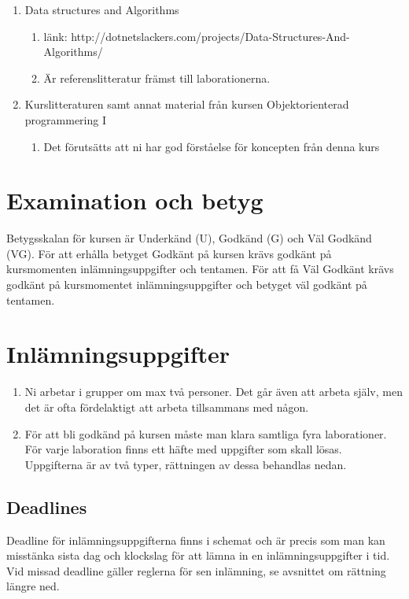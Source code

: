 \documentclass{article}
\begin{document}
  \begin{enumerate}
  \item Data structures and Algorithms
   		\begin{enumerate}
   		  \item länk: http://dotnetslackers.com/projects/Data-Structures-And-Algorithms/
   		  \item Är referenslitteratur främst till laborationerna.
   		\end{enumerate}
  \item Kurslitteraturen samt annat material från kursen Objektorienterad programmering I
     		\begin{enumerate}
     		  \item Det förutsätts att ni har god förståelse för koncepten från denna kurs	 
     		\end{enumerate}
  \end{enumerate}
  \section*{Examination och betyg}
  Betygsskalan för kursen är Underkänd (U), Godkänd (G) och Väl Godkänd (VG). För att
  erhålla betyget Godkänt på kursen krävs godkänt på kursmomenten inlämningsuppgifter
  och tentamen. För att få Väl Godkänt krävs godkänt på kursmomentet inlämningsuppgifter
  och betyget väl godkänt på tentamen.
  
  \section*{Inlämningsuppgifter}
  
  \begin{enumerate}
    	          \item Ni arbetar i grupper om max två personer. Det går även att arbeta själv, men det är ofta fördelaktigt att arbeta tillsammans med någon.
    	          \item För att bli godkänd på kursen måste man klara samtliga fyra laborationer. För varje laboration finns ett häfte med uppgifter som skall lösas. Uppgifterna är av två typer, rättningen av dessa behandlas nedan.	          
  \end{enumerate}
  
  \subsection*{Deadlines}
  
  Deadline för inlämningsuppgifterna finns i schemat och är precis som man kan misstänka
  sista dag och klockslag för att lämna in en inlämningsuppgifter i tid. Vid missad deadline
  gäller reglerna för sen inlämning, se avsnittet om rättning längre ned.
  
\end{document}
